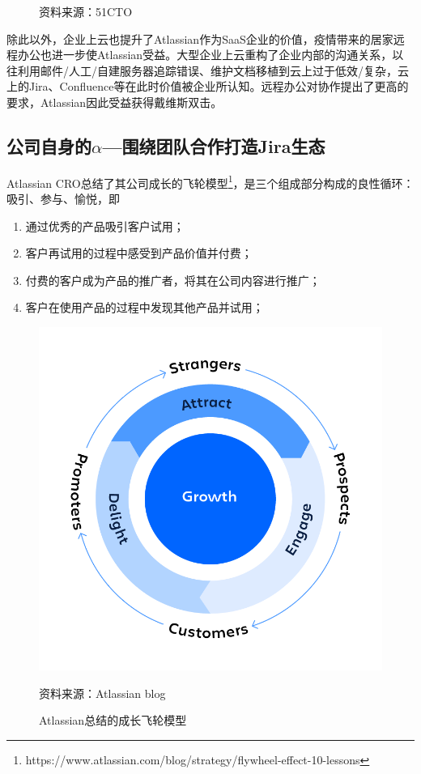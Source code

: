 \begin{figure}[H]
\begin{center}
\begin{minipage}{0.3\linewidth}
        \end{minipage}
    \end{center}
    \footnotesize{资料来源：51CTO}
\end{figure}

除此以外，企业上云也提升了Atlassian作为SaaS企业的价值，疫情带来的居家远程办公也进一步使Atlassian受益。大型企业上云重构了企业内部的沟通关系，以往利用邮件/人工/自建服务器追踪错误、维护文档移植到云上过于低效/复杂，云上的Jira、Confluence等在此时价值被企业所认知。远程办公对协作提出了更高的要求，Atlassian因此受益获得戴维斯双击。
\subsection{公司自身的\texorpdfstring{$\alpha$}——围绕团队合作打造Jira生态}
Atlassian CRO总结了其公司成长的飞轮模型\footnote{https://www.atlassian.com/blog/strategy/flywheel-effect-10-lessons}，是三个组成部分构成的良性循环：吸引、参与、愉悦，即
\begin{enumerate}
    \item 通过优秀的产品吸引客户试用；
    \item 客户再试用的过程中感受到产品价值并付费；
    \item 付费的客户成为产品的推广者，将其在公司内容进行推广；
    \item 客户在使用产品的过程中发现其他产品并试用；
\end{enumerate}
\begin{figure}[H]
    \caption{Atlassian总结的成长飞轮模型}
    \begin{center}
        \includegraphics[width=0.8\linewidth]{img/flywheel.png}
    \end{center}
    \footnotesize{资料来源：Atlassian blog}
\end{figure}
